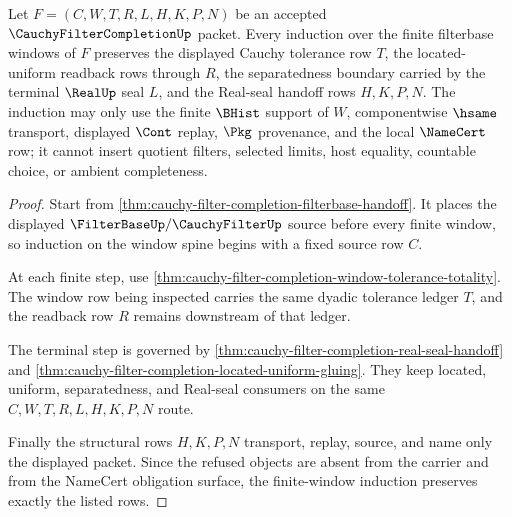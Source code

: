 \begin{theorem}
\label{thm:cauchy-filter-completion-finite-window-induction}
Let $F=(C,W,T,R,L,H,K,P,N)$ be an accepted $\CauchyFilterCompletionUp$ packet. Every induction over the finite filterbase windows of $F$ preserves the displayed Cauchy tolerance row $T$, the located-uniform readback rows through $R$, the separatedness boundary carried by the terminal $\RealUp$ seal $L$, and the Real-seal handoff rows $H,K,P,N$. The induction may only use the finite $\BHist$ support of $W$, componentwise $\hsame$ transport, displayed $\Cont$ replay, $\Pkg$ provenance, and the local $\NameCert$ row; it cannot insert quotient filters, selected limits, host equality, countable choice, or ambient completeness.
\end{theorem}
\begin{proof}
Start from \autoref{thm:cauchy-filter-completion-filterbase-handoff}. It places the displayed $\FilterBaseUp/\CauchyFilterUp$ source before every finite window, so induction on the window spine begins with a fixed source row $C$.

At each finite step, use \autoref{thm:cauchy-filter-completion-window-tolerance-totality}. The window row being inspected carries the same dyadic tolerance ledger $T$, and the readback row $R$ remains downstream of that ledger.

The terminal step is governed by \autoref{thm:cauchy-filter-completion-real-seal-handoff} and \autoref{thm:cauchy-filter-completion-located-uniform-gluing}. They keep located, uniform, separatedness, and Real-seal consumers on the same $C,W,T,R,L,H,K,P,N$ route.

Finally the structural rows $H,K,P,N$ transport, replay, source, and name only the displayed packet. Since the refused objects are absent from the carrier and from the NameCert obligation surface, the finite-window induction preserves exactly the listed rows.
\end{proof}

